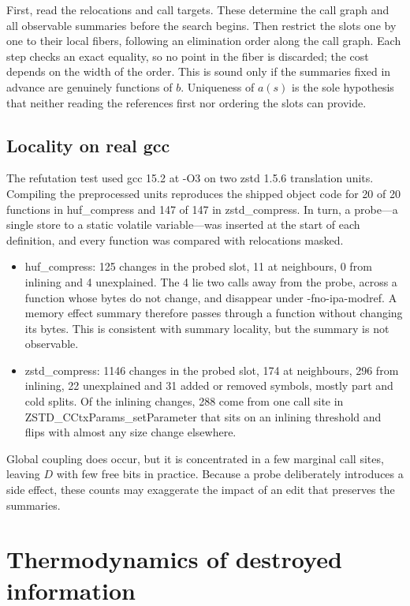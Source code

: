 \documentclass[11pt]{article}
\theoremstyle{definition}
\theoremstyle{remark}
\begin{document}
First, read the relocations and call targets. These determine the call graph and all observable summaries before the search begins. Then restrict the slots one by one to their local fibers, following an elimination order along the call graph. Each step checks an exact equality, so no point in the fiber is discarded; the cost depends on the width of the order. This is sound only if the summaries fixed in advance are genuinely functions of $b$. Uniqueness of $a(s)$ is the sole hypothesis that neither reading the references first nor ordering the slots can provide.

\subsection{Locality on real gcc}

The refutation test used gcc 15.2 at -O3 on two zstd 1.5.6 translation units. Compiling the preprocessed units reproduces the shipped object code for 20 of 20 functions in huf\_compress and 147 of 147 in zstd\_compress. In turn, a probe—a single store to a static volatile variable—was inserted at the start of each definition, and every function was compared with relocations masked.

\begin{itemize}
  \item huf\_compress: 125 changes in the probed slot, 11 at neighbours, 0 from inlining and 4 unexplained. The 4 lie two calls away from the probe, across a function whose bytes do not change, and disappear under -fno-ipa-modref. A memory effect summary therefore passes through a function without changing its bytes. This is consistent with summary locality, but the summary is not observable.
  \item zstd\_compress: 1146 changes in the probed slot, 174 at neighbours, 296 from inlining, 22 unexplained and 31 added or removed symbols, mostly part and cold splits. Of the inlining changes, 288 come from one call site in ZSTD\_CCtxParams\_setParameter that sits on an inlining threshold and flips with almost any size change elsewhere.
\end{itemize}

Global coupling does occur, but it is concentrated in a few marginal call sites, leaving $D$ with few free bits in practice. Because a probe deliberately introduces a side effect, these counts may exaggerate the impact of an edit that preserves the summaries.

\section{Thermodynamics of destroyed information}\label{sec:thermo}
\end{document}
